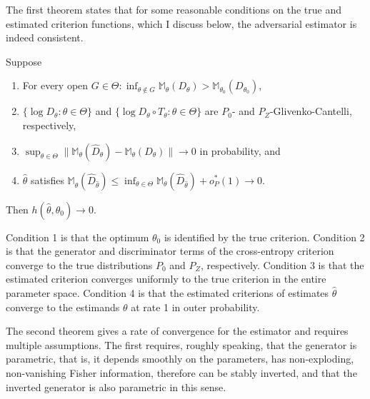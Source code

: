 The first theorem states that for some reasonable conditions on the true and estimated criterion functions, which I discuss below, the adversarial estimator is indeed consistent.

\begin{theorem}
    \label{th:kmp_1}
    Suppose
    \begin{enumerate}
        \item For every open $G \in \Theta : \inf_{\theta \notin G} \mathbb{M}_{\theta}(D_{\theta}) > \mathbb{M}_{\theta_0}(D_{\theta_0})$,
        \item $\{ \log D_{\theta} : \theta \in \Theta \}$ and $\{ \log D_{\theta} \circ T_{\theta}: \theta \in \Theta \}$ are $P_0$- and $P_Z$-Glivenko-Cantelli, respectively,
        \item $\sup_{\theta \in \Theta} \| \mathbb{M}_{\theta}(\hat{D}_{\theta}) - \mathbb{M}_{\theta}(D_{\theta}) \| \rightarrow 0$ in probability, and
        \item $\hat{\theta}$ satisfies $\mathbb{M}_{\hat{\theta}}(\hat{D}_{\hat{\theta}}) \leq \inf_{\theta \in \Theta} \mathbb{M}_{\theta}(\hat{D}_{\hat{\theta}}) + o_P^{*}(1) \rightarrow 0$.
    \end{enumerate}
    Then $h(\hat{\theta}, \theta_0) \rightarrow 0$.
\end{theorem}

Condition 1 is that the optimum $\theta_0$ is identified by the true criterion.
Condition 2 is that the generator and discriminator terms of the cross-entropy criterion converge to the true distributions $P_0$ and $P_Z$, respectively. %
Condition 3 is that the estimated criterion converges uniformly to the true criterion in the entire parameter space.
Condition 4 is that the estimated criterions of estimates $\hat{\theta}$ converge to the estimands $\theta$ at rate 1 in outer probability. %

The second theorem gives a rate of convergence for the estimator and requires multiple assumptions.
The first requires, roughly speaking, that the generator is parametric, that is, it depends smoothly on the parameters, has non-exploding, non-vanishing Fisher information, therefore can be stably inverted, and that the inverted generator is also parametric in this sense. %

